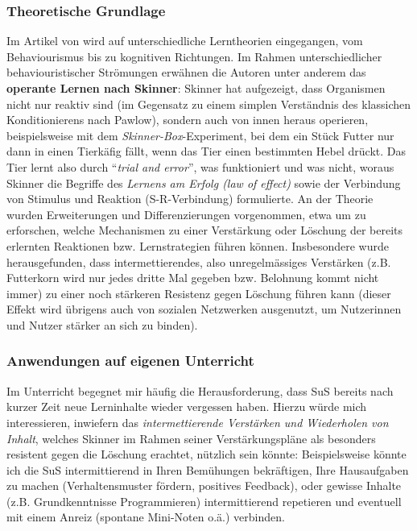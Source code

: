 \begin{myExBox}[title=Intermettierendes Verstärken von gewünschtem Lern-Verhalten]
\subsubsection*{Theoretische Grundlage}
Im Artikel von \textcite{alma99117228235505511} wird auf unterschiedliche Lerntheorien eingegangen, vom Behaviourismus bis zu kognitiven Richtungen. Im Rahmen unterschiedlicher behaviouristischer Strömungen erwähnen die Autoren unter anderem 
das \textbf{operante Lernen nach Skinner}: Skinner hat aufgezeigt, dass Organismen nicht nur reaktiv sind (im Gegensatz zu einem simplen Verständnis des klassichen Konditionierens nach Pawlow), sondern auch von innen heraus operieren, beispielsweise mit dem \textit{Skinner-Box}-Experiment, bei dem ein Stück Futter nur dann in einen Tierkäfig fällt, wenn das Tier einen bestimmten Hebel drückt. Das Tier lernt also durch ``\textit{trial and error}'', was funktioniert und was nicht, woraus Skinner die Begriffe des \textit{Lernens am Erfolg (law of effect)} sowie der Verbindung von Stimulus und Reaktion (S-R-Verbindung) formulierte.
An der Theorie wurden Erweiterungen und Differenzierungen vorgenommen, etwa um zu erforschen, welche Mechanismen zu einer Verstärkung oder Löschung der bereits erlernten Reaktionen bzw. Lernstrategien führen können. Insbesondere wurde herausgefunden, dass intermettierendes, also unregelmässiges Verstärken (z.B. Futterkorn wird nur jedes dritte Mal gegeben bzw. Belohnung kommt nicht immer) zu einer noch stärkeren Resistenz gegen Löschung führen kann (dieser Effekt wird übrigens auch von sozialen Netzwerken ausgenutzt, um Nutzerinnen und Nutzer stärker an sich zu binden).

\subsubsection*{Anwendungen auf eigenen Unterricht}
Im Unterricht begegnet mir häufig die Herausforderung, dass SuS bereits nach kurzer Zeit neue Lerninhalte wieder vergessen haben. Hierzu würde mich interessieren, inwiefern das \textit{intermettierende Verstärken und Wiederholen von Inhalt}, welches Skinner im Rahmen seiner Verstärkungspläne als besonders resistent gegen die Löschung erachtet, nützlich sein könnte: Beispielsweise könnte ich die SuS intermittierend in Ihren Bemühungen bekräftigen, Ihre Hausaufgaben zu machen (Verhaltensmuster fördern, positives Feedback), oder gewisse Inhalte (z.B. Grundkenntnisse Programmieren) intermittierend repetieren und eventuell mit einem Anreiz (spontane Mini-Noten o.ä.) verbinden.
\end{myExBox}

